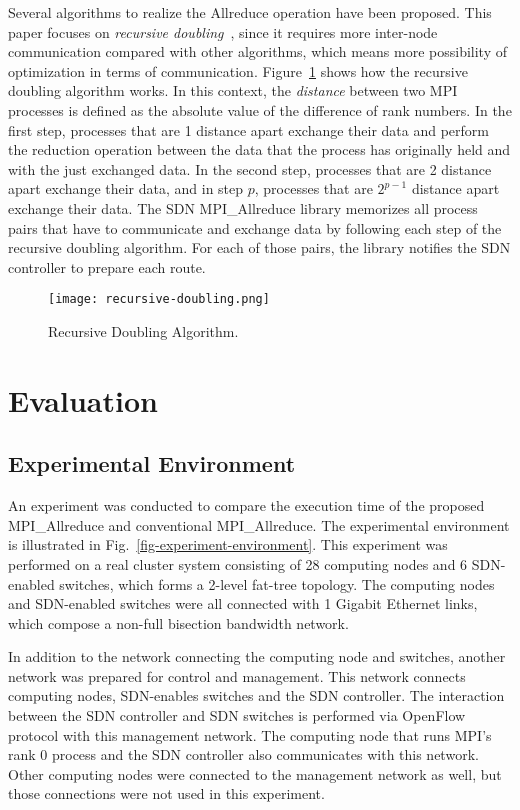 Several algorithms to realize the Allreduce operation have been proposed. This
paper focuses on \emph{recursive doubling}~\autocite{Thakur2005}, since it
requires more inter-node communication compared with other algorithms, which
means more possibility of optimization in terms of communication.
Figure~\ref{fig-recursive-doubling} shows how the recursive doubling algorithm
works. In this context, the \emph{distance} between two MPI processes is
defined as the absolute value of the difference of rank numbers. In the first
step, processes that are 1 distance apart exchange their data and perform the
reduction operation between the data that the process has originally held and
with the just exchanged data. In the second step, processes that are 2
distance apart exchange their data, and in step \(p\), processes that are
\(2^{p - 1}\) distance apart exchange their data. The SDN MPI\_Allreduce
library memorizes all process pairs that have to communicate and exchange data
by following each step of the recursive doubling algorithm. For each of those
pairs, the library notifies the SDN controller to prepare each route.

\begin{figure}[htbp]
    \centering
    \texttt{[image: recursive-doubling.png]}
    \caption{Recursive Doubling Algorithm.}%
    \label{fig-recursive-doubling}
\end{figure}

\section{Evaluation}\label{iii-evaluation}

\subsection{Experimental Environment}

An experiment was conducted to compare the execution time of the
proposed MPI\_Allreduce and conventional
MPI\_Allreduce. The experimental environment is illustrated in
Fig.~\ref{fig-experiment-environment}. This experiment was performed on
a real cluster system consisting of 28 computing nodes and 6 SDN-enabled
switches, which forms a 2-level fat-tree topology. The computing nodes
and SDN-enabled switches were all connected with 1 Gigabit Ethernet
links, which compose a non-full bisection bandwidth network.

In addition to the network connecting the computing node and switches,
another network was prepared for control and management. This network
connects computing nodes, SDN-enables switches and the SDN controller.
The interaction between the SDN controller and SDN switches is performed
via OpenFlow protocol with this management network. The computing node
that runs MPI's rank 0 process and the SDN controller also communicates
with this network. Other computing nodes were connected to the
management network as well, but those connections were not used in this
experiment.


